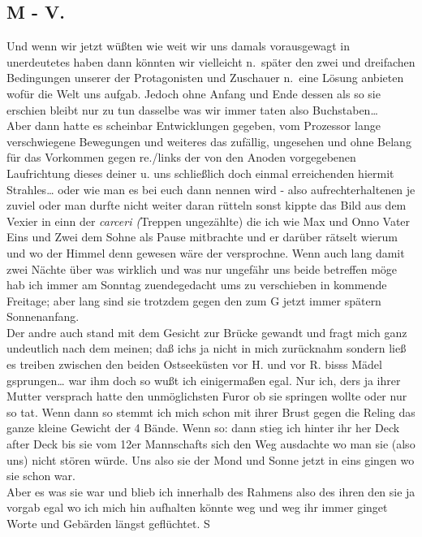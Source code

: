 \documentclass[
]{article}
\author{}
\date{\vspace{-2.5em}}
\begin{document}
\subsection{M - V.}\label{m---v.}

Und wenn wir jetzt wüßten wie weit wir uns damals vorausgewagt in
unerdeutetes haben dann könnten wir vielleicht n.~später den zwei und
dreifachen Bedingungen unserer der Protagonisten und Zuschauer n.~eine
Lösung anbieten wofür die Welt uns aufgab. Jedoch ohne Anfang und Ende
dessen als so sie erschien bleibt nur zu tun dasselbe was wir immer
taten also Buchstaben\ldots{}\\
Aber dann hatte es scheinbar Entwicklungen gegeben, vom Prozessor lange
verschwiegene Bewegungen und weiteres das zufällig, ungesehen und ohne
Belang für das Vorkommen gegen re./links der von den Anoden vorgegebenen
Laufrichtung dieses deiner u. uns schließlich doch einmal erreichenden
hiermit Strahles\ldots{} oder wie man es bei euch dann nennen wird -
also aufrechterhaltenen je zuviel oder man durfte nicht weiter daran
rütteln sonst kippte das Bild aus dem Vexier in einn der \emph{carceri
(}Treppen ungezählte) die ich wie Max und Onno Vater Eins und Zwei dem
Sohne als Pause mitbrachte und er darüber rätselt wierum und wo der
Himmel denn gewesen wäre der versprochne. Wenn auch lang damit zwei
Nächte über was wirklich und was nur ungefähr uns beide betreffen möge
hab ich immer am Sonntag zuendegedacht ums zu verschieben in kommende
Freitage; aber lang sind sie trotzdem gegen den zum G jetzt immer
spätern Sonnenanfang.\\
Der andre auch stand mit dem Gesicht zur Brücke gewandt und fragt mich
ganz undeutlich nach dem meinen; daß ichs ja nicht in mich zurücknahm
sondern ließ es treiben zwischen den beiden Ostseeküsten vor H. und vor
R. bisss Mädel gsprungen\ldots{} war ihm doch so wußt ich einigermaßen
egal. Nur ich, ders ja ihrer Mutter versprach hatte den unmöglichsten
Furor ob sie springen wollte oder nur so tat. Wenn dann so stemmt ich
mich schon mit ihrer Brust gegen die Reling das ganze kleine Gewicht der
4 Bände. Wenn so: dann stieg ich hinter ihr her Deck after Deck bis sie
vom 12er Mannschafts sich den Weg ausdachte wo man sie (also uns) nicht
stören würde. Uns also sie der Mond und Sonne jetzt in eins gingen wo
sie schon war.\\
Aber es was sie war und blieb ich innerhalb des Rahmens also des ihren
den sie ja vorgab egal wo ich mich hin aufhalten könnte weg und weg ihr
immer ginget Worte und Gebärden längst geflüchtet. \textquotesingle S
\end{document}

